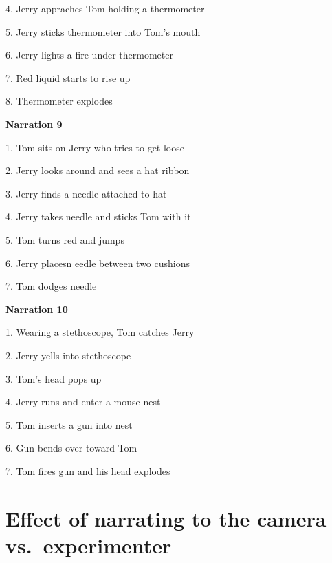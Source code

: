 \documentclass[review]{elsarticle} %
\begin{document}
4. Jerry appraches Tom holding a thermometer

5. Jerry sticks thermometer into Tom's mouth

6. Jerry lights a fire under thermometer

7. Red liquid starts to rise up

8. Thermometer explodes

\textbf{Narration 9}

1. Tom sits on Jerry who tries to get loose

2. Jerry looks around and sees a hat ribbon

3. Jerry finds a needle attached to hat

4. Jerry takes needle and sticks Tom with it

5. Tom turns red and jumps

6. Jerry placesn eedle between two cushions

7. Tom dodges needle

\textbf{Narration 10}

1. Wearing a stethoscope, Tom catches Jerry

2. Jerry yells into stethoscope

3. Tom's head pops up

4. Jerry runs and enter a mouse nest

5. Tom inserts a gun into nest

6. Gun bends over toward Tom

7. Tom fires gun and his head explodes

\clearpage

\onecolumn

\hypertarget{effect-of-narrating-to-the-camera-vs.-experimenter}{%
\section{Effect of narrating to the camera
vs.~experimenter}\label{effect-of-narrating-to-the-camera-vs.-experimenter}}

\label{section:c}
\end{document}
